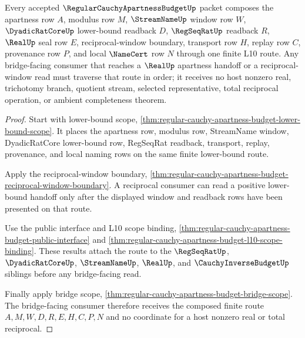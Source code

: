 \begin{theorem}
\label{thm:regular-cauchy-apartness-budget-route-composition}
Every accepted $\RegularCauchyApartnessBudgetUp$ packet composes the apartness row $A$, modulus row $M$, $\StreamNameUp$ window row $W$, $\DyadicRatCoreUp$ lower-bound readback $D$, $\RegSeqRatUp$ readback $R$, $\RealUp$ seal row $E$, reciprocal-window boundary, transport row $H$, replay row $C$, provenance row $P$, and local $\NameCert$ row $N$ through one finite L10 route. Any bridge-facing consumer that reaches a $\RealUp$ apartness handoff or a reciprocal-window read must traverse that route in order; it receives no host nonzero real, trichotomy branch, quotient stream, selected representative, total reciprocal operation, or ambient completeness theorem.
\end{theorem}
\begin{proof}
Start with lower-bound scope, \autoref{thm:regular-cauchy-apartness-budget-lower-bound-scope}. It places the apartness row, modulus row, StreamName window, DyadicRatCore lower-bound row, RegSeqRat readback, transport, replay, provenance, and local naming rows on the same finite lower-bound route.

Apply the reciprocal-window boundary, \autoref{thm:regular-cauchy-apartness-budget-reciprocal-window-boundary}. A reciprocal consumer can read a positive lower-bound handoff only after the displayed window and readback rows have been presented on that route.

Use the public interface and L10 scope binding, \autoref{thm:regular-cauchy-apartness-budget-public-interface} and \autoref{thm:regular-cauchy-apartness-budget-l10-scope-binding}. These results attach the route to the $\RegSeqRatUp$, $\DyadicRatCoreUp$, $\StreamNameUp$, $\RealUp$, and $\CauchyInverseBudgetUp$ siblings before any bridge-facing read.

Finally apply bridge scope, \autoref{thm:regular-cauchy-apartness-budget-bridge-scope}. The bridge-facing consumer therefore receives the composed finite route $A,M,W,D,R,E,H,C,P,N$ and no coordinate for a host nonzero real or total reciprocal.
\end{proof}

